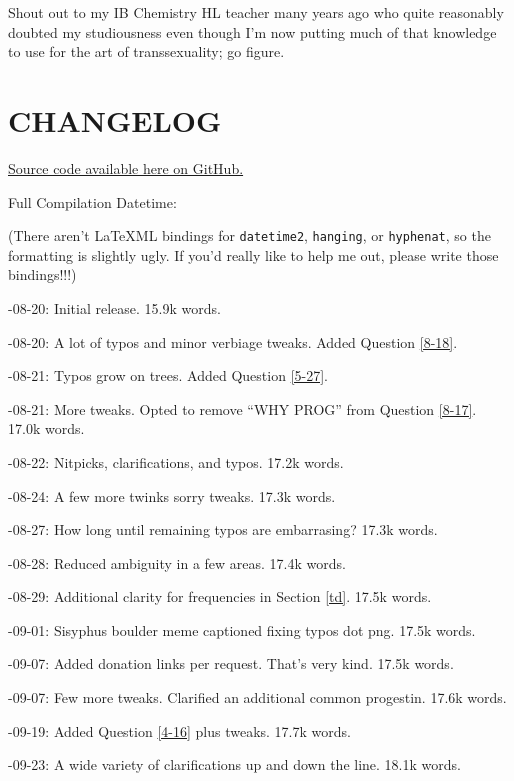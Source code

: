 \documentclass{article}
\begin{document}
Shout out to my IB Chemistry HL teacher many years ago who quite reasonably doubted my studiousness even though I’m now putting much of that knowledge to use for the art of transsexuality; go figure. 

 

\section*{CHANGELOG}

\noindent \href{https://github.com/Juicysteak117/pghrt/}{Source code available here on GitHub.}

\noindent Full Compilation Datetime: \DTMnow

\noindent(There aren't LaTeXML bindings for \texttt{datetime2}, \texttt{hanging}, or \texttt{hyphenat}, so the formatting is slightly ugly. If you'd really like to help me out, please write those bindings!!!)

-08-20: Initial release. 15.9k words.

-08-20: A lot of typos and minor verbiage tweaks. Added Question \ref{8-18}.

-08-21: Typos grow on trees. Added Question \ref{5-27}.

-08-21: More tweaks. Opted to remove “WHY PROG” from Question \ref{8-17}. 17.0k words.

-08-22: Nitpicks, clarifications, and typos. 17.2k words.

-08-24: A few more twinks sorry tweaks. 17.3k words.

-08-27: How long until remaining typos are embarrasing? 17.3k words.

-08-28: Reduced ambiguity in a few areas. 17.4k words.

-08-29: Additional clarity for frequencies in Section \ref{td}. 17.5k words.

-09-01: Sisyphus boulder meme captioned fixing typos dot png. 17.5k words.

-09-07: Added donation links per request. That's very kind. 17.5k words.

-09-07: Few more tweaks. Clarified an additional common progestin. 17.6k words.

-09-19: Added Question \ref{4-16} plus tweaks. 17.7k words.

-09-23: A wide variety of clarifications up and down the line. 18.1k words.
\end{document}
